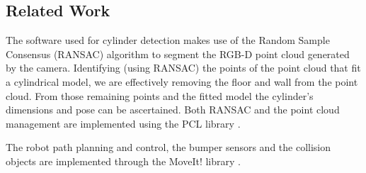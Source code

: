 \subsection*{Related Work}
The software used for cylinder detection makes use of the Random Sample Consensus (RANSAC) algorithm  \cite{RANSAC} to segment the RGB-D point cloud generated by the camera. Identifying (using RANSAC) the points of the point cloud that fit a cylindrical model, we are effectively removing the floor and wall from the point cloud. From those remaining points and the fitted model the cylinder's dimensions and pose can be ascertained. Both RANSAC and the point cloud management are implemented using the PCL library \cite{PCL}.

The robot path planning and control, the bumper sensors and the collision objects are implemented through the MoveIt! library \cite{moveit}.
